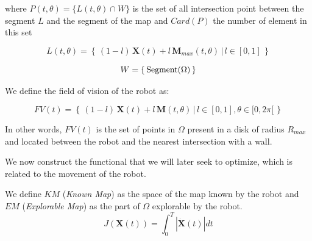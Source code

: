 \documentclass[../main.tex]{subfiles}
\begin{document}

where $P(t, \theta) = \{L(t, \theta) \cap W\}$ is the set of all intersection point between the segment $L$ and the segment of the map and $Card(P)$ the number of element in this set

\begin{equation*}
	\displaystyle
	L(t, \theta) = \left\{ \, (1 - l) \, \mathbf{X}(t) + l\, \mathbf{M}_{max}(t, \theta) \,|\, l \in [0, 1]\, \right\}
\end{equation*}

\begin{equation*}
	\displaystyle
	W = \left\{ \, \text{\rmfamily Segment} (\Omega)\, \right\}
\end{equation*}

We define the field of vision of the robot as:

\begin{equation}
	\displaystyle
	FV(t) = \left\{ \, (1 - l) \, \mathbf{X}(t) + l\, \mathbf{M}(t, \theta) \,|\, l \in [0, 1], \theta \in [0, 2 \pi[ \, \right\}
\end{equation}

In other words, $FV(t)$ is the set of points in $\Omega$ present in a disk of radius $R_{max}$ and located between the robot and the nearest intersection with a wall.
\vspace{0.5em}

We now construct the functional that we will later seek to optimize, which is related to the movement of the robot.
\vspace{0.5em}

We define $\mathit{KM}$ (\textit{Known Map}) as the space of the map known by the robot and $\mathit{EM}$ (\textit{Explorable Map}) as the part of $\Omega$ explorable by the robot.
\begin{equation}
	\displaystyle
	J(\mathbf{X}(t)) = \int_{0}^{T} | \mathbf{\dot{X}}(t) | dt
\end{equation}
\vspace{0.5em}
\end{document}
